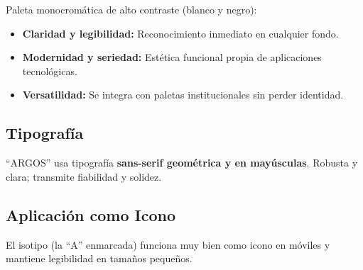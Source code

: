 Paleta monocromática de alto contraste (blanco y negro):

\begin{itemize}
		\item \textbf{Claridad y legibilidad:} Reconocimiento inmediato en cualquier fondo.
		\item \textbf{Modernidad y seriedad:} Estética funcional propia de aplicaciones tecnológicas.
		\item \textbf{Versatilidad:} Se integra con paletas institucionales sin perder identidad.
\end{itemize}

\subsection*{Tipografía}

“ARGOS” usa tipografía \textbf{sans-serif geométrica y en mayúsculas}. Robusta y clara; transmite fiabilidad y solidez.

\subsection*{Aplicación como Icono}

El isotipo (la “A” enmarcada) funciona muy bien como icono en móviles y mantiene legibilidad en tamaños pequeños.
